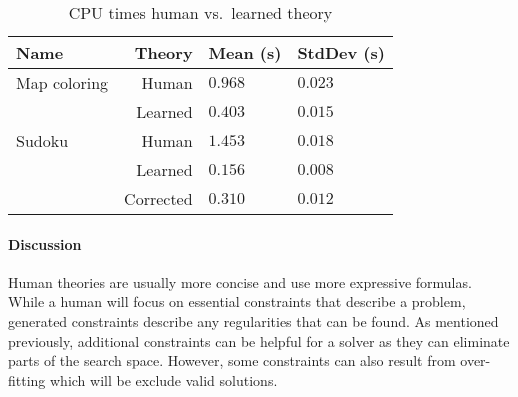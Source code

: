 \begin{experiment}[\textsc{Speed}]


	\begin{table}[!htp]
		\begin{tabularx}{\textwidth}{lr|XX}
			\textbf{Name} & \textbf{Theory} & \textbf{Mean (s)} & \textbf{StdDev (s)} \\
			\toprule
			Map coloring & Human & $0.968$ & $0.023$ \\
			& Learned & $0.403$ & $0.015$ \\
			\midrule
			Sudoku & Human & $1.453$ & $0.018$ \\ 
			& Learned & $0.156$ & $0.008$ \\
			& Corrected & $0.310$ & $0.012$
		\end{tabularx}
		\label{tbl:speed_human_machine}
		\caption{CPU times human vs.~learned theory}
	\end{table}

\end{experiment}

\paragraph{Discussion}
Human theories are usually more concise and use more expressive formulas.
While a human will focus on essential constraints that describe a problem, generated constraints describe any regularities that can be found.
As mentioned previously, additional constraints can be helpful for a solver as they can eliminate parts of the search space.
However, some constraints can also result from over-fitting which will be exclude valid solutions.

